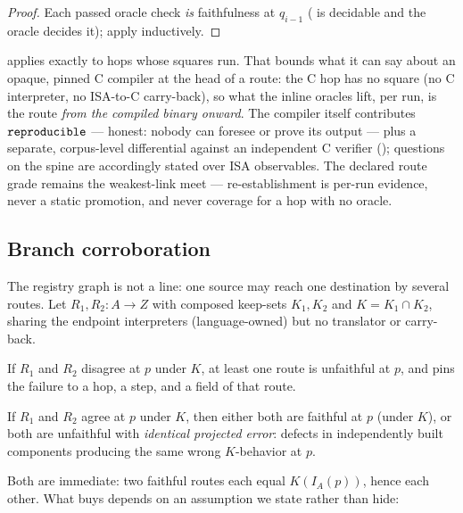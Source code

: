 \begin{proof}
Each passed oracle check \emph{is} faithfulness at $q_{i-1}$
( is decidable and the oracle decides it); apply
 inductively.
\end{proof}

 applies exactly to hops whose squares run. That
bounds what it can say about an opaque, pinned C compiler at the head of
a route: the C hop has no square (no C interpreter, no ISA-to-C
carry-back), so what the inline oracles lift, per run, is the route
\emph{from the compiled binary onward}. The compiler itself contributes
$\mathtt{reproducible}$ --- honest: nobody can foresee or prove its output --- plus a
separate, corpus-level differential against an independent C verifier
(); questions on the spine are accordingly
stated over ISA observables. The declared route grade remains the
weakest-link meet --- re-establishment is per-run evidence, never a
static promotion, and never coverage for a hop with no oracle.

\subsection{Branch corroboration}
\label{sec:branching}

The registry graph is not a line: one source may reach one destination by
several routes. Let $R_1, R_2 : A \to Z$ with composed keep-sets
$K_1, K_2$ and $K = K_1 \cap K_2$, sharing the endpoint interpreters
(language-owned) but no translator or carry-back.

\begin{lemma}
\label{lem:disagree}
If $R_1$ and $R_2$ disagree at $p$ under $K$, at least one route is
unfaithful at $p$, and  pins the failure to a hop,
a step, and a field of that route.
\end{lemma}

\begin{lemma}
\label{lem:agree}
If $R_1$ and $R_2$ agree at $p$ under $K$, then either both are faithful
at $p$ (under $K$), or both are unfaithful with \emph{identical projected
error}: defects in independently built components producing the same
wrong $K$-behavior at $p$.
\end{lemma}

Both are immediate: two faithful routes each equal $K(I_A(p))$, hence
each other. What  buys depends on an assumption we state
rather than hide:

